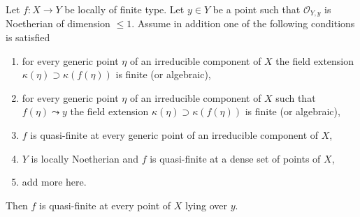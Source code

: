 \begin{lemma}
\label{lemma-quasi-finite-in-codim-1}
Let $f : X \to Y$ be locally of finite type. Let $y \in Y$ be a point
such that $\mathcal{O}_{Y, y}$ is Noetherian of dimension $\leq 1$.
Assume in addition one of the following conditions is satisfied
\begin{enumerate}
\item for every generic point $\eta$ of an irreducible component
of $X$ the field extension $\kappa(\eta) \supset \kappa(f(\eta))$
is finite (or algebraic),
\item for every generic point $\eta$ of an irreducible component
of $X$ such that $f(\eta) \leadsto y$ the field extension
$\kappa(\eta) \supset \kappa(f(\eta))$ is finite (or algebraic),
\item $f$ is quasi-finite at every generic point of an
irreducible component of $X$,
\item $Y$ is locally Noetherian and $f$
is quasi-finite at a dense set of points of $X$,
\item add more here.
\end{enumerate}
Then $f$ is quasi-finite at every point of $X$ lying over $y$.
\end{lemma}

